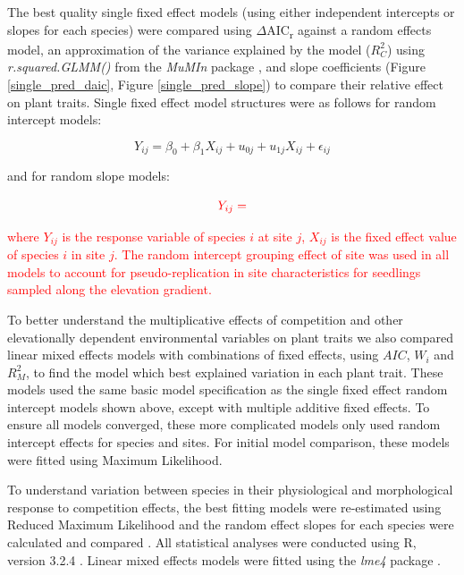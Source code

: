 \documentclass[a4paper, 11pt]{article}
\newcommand{\todo}[1]{\textcolor{red}{#1}}   %
\begin{document}
The best quality single fixed effect models (using either independent intercepts or slopes for each species) were compared using $\Delta$AIC\textsubscript{r} against a random effects model,  an approximation of the variance explained by the model ($R_C^2$) using \textit{r.squared.GLMM()} from the \textit{MuMIn} package \citep{MuMIn}, and slope coefficients (Figure \ref{single_pred_daic}, Figure \ref{single_pred_slope}) to compare their relative effect on plant traits. Single fixed effect model structures were as follows for random intercept models:

\begin{equation}
\label{eq:intercept_model}
Y_{ij} = \beta_{0} + \beta_{1}X_{ij} + u_{0j} + u_{1j}X_{ij} + \epsilon_{ij}
\end{equation}

and for random slope models:

\begin{equation}
\label{eq:slope_model}
\todo{Y_{ij} = }
\end{equation}

\todo{where $Y_{ij}$ is the response variable of species $i$ at site $j$, $X_{ij}$ is the fixed effect value of species $i$ in site $j$. The random intercept grouping effect of site was used in all models to account for pseudo-replication in site characteristics for seedlings sampled along the elevation gradient.}

To better understand the multiplicative effects of competition and other elevationally dependent environmental variables on plant traits we also compared linear mixed effects models with combinations of fixed effects, using $AIC$, $W_i$ and $R_M^2$, to find the model which best explained variation in each plant trait. These models used the same basic model specification as the single fixed effect random intercept models shown above, except with multiple additive fixed effects. To ensure all models converged, these more complicated models only used random intercept effects for species and sites. For initial model comparison, these models were fitted using Maximum Likelihood.

To understand variation between species in their physiological and morphological response to competition effects, the best fitting models were re-estimated using Reduced Maximum Likelihood and the random effect slopes for each species were calculated and compared \citep{Bolker2008}. All statistical analyses were conducted using R, version 3.2.4 \citep{R2019}. Linear mixed effects models were fitted using the \textit{lme4} package \citep{Bates2015}.
\end{document}
